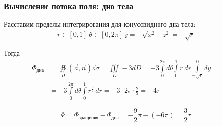 \begin{frame}\frametitle{Вычисление потока поля: дно тела}

	Расставим пределы интегрирования для конусовидного дна тела:
	\begin{align*}
		r \in [0,1] \
		\theta \in [0, 2\pi] \
		y = -\sqrt{x^2 + z^2} = -\sqrt{r}
	\end{align*}

	Тогда
	\begin{align*}
		\Phi_{\text{дна}}
    &=  \oiint\limits_{D}\left( \vec {a}, \vec {n} \right) d\sigma = \iiint\limits_D -3 dD
		= -3 \int\limits_{0}^{2 \pi} d \theta
		\int\limits_{0}^{1} r~dr
		\int\limits_{-\sqrt{r}}^{0} dy = \\
    &= -3 \int\limits_{0}^{2 \pi} d \theta
		\int\limits_{0}^{1}r^{\frac{3}{2}}~dr
		= -3 \cdot 2\pi \cdot \frac{2}{3} = -4 \pi
	\end{align*}

	\begin{equation*}
		\Phi = \Phi_{\text{вращения}} - \Phi_{\text{дна}} = -\frac{9}{2}\pi - (-6 \pi) = \frac{3}{2}\pi
	\end{equation*}
\end{frame}
